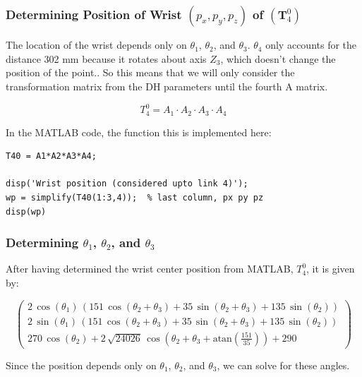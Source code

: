 \subsubsection{Determining Position of Wrist \texorpdfstring{$\left(p_x, p_y, p_z\right)$}{px, py, pz} of \texorpdfstring{$\left(\mathbf{T}_4^0\right)$}{T40}}

The location of the wrist depends only on \(\theta_1\), \(\theta_2\), and \(\theta_3\). \(\theta_4\) only accounts for the distance 302 mm because it rotates about axis \(Z_3\), which doesn’t change the position of the point.. So this means that we will only consider the transformation matrix from the DH parameters until the fourth A matrix.

\[
  T_4^0 = A_1 \cdot A_2 \cdot A_3 \cdot A_4
\]

\noindent In the MATLAB code, the function  this is implemented here:

\begin{lstlisting}[frame=single,style=Matlab-editor]
T40 = A1*A2*A3*A4;

disp('Wrist position (considered upto link 4)');
wp = simplify(T40(1:3,4));  % last column, px py pz
disp(wp)
\end{lstlisting}


\subsubsection{Determining \texorpdfstring{$\theta_1$, $\theta_2$, and $\theta_3$}{theta1, theta2, and theta3}}

\noindent After having determined the wrist center position from MATLAB, \(T_4^0\), it is given by:

\[
  \left(\begin{array}{c}
      2\,\cos \left(\theta_1 \right)\,{\left(151\,\cos \left(\theta_2 +\theta_3 \right)+35\,\sin \left(\theta_2 +\theta_3 \right)+135\,\sin \left(\theta_2 \right)\right)} \\
      2\,\sin \left(\theta_1 \right)\,{\left(151\,\cos \left(\theta_2 +\theta_3 \right)+35\,\sin \left(\theta_2 +\theta_3 \right)+135\,\sin \left(\theta_2 \right)\right)} \\
      270\,\cos \left(\theta_2 \right)+2\,\sqrt{24026}\,\cos \left(\theta_2 +\theta_3 +\mathrm{atan}\left(\frac{151}{35}\right)\right)+290
    \end{array}\right)
\]

\noindent Since the position depends only on \(\theta_1\), \(\theta_2\), and \(\theta_3\), we can solve for these angles.

